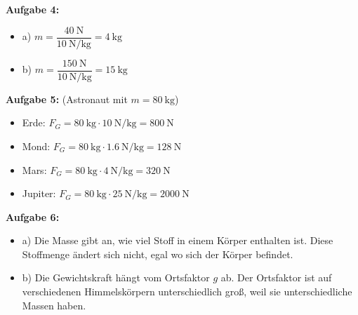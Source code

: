 \documentclass[a4paper,11pt]{article}
\begin{document}
\textbf{Aufgabe 4:}
\begin{itemize}[nosep]
    \item a) $m = \dfrac{\SI{40}{\newton}}{\SI{10}{\newton\per\kilogram}} = \SI{4}{\kilogram}$
    \item b) $m = \dfrac{\SI{150}{\newton}}{\SI{10}{\newton\per\kilogram}} = \SI{15}{\kilogram}$
\end{itemize}

\vspace{3mm}

\textbf{Aufgabe 5:} (Astronaut mit $m = \SI{80}{\kilogram}$)
\begin{itemize}[nosep]
    \item Erde: $F_G = \SI{80}{\kilogram} \cdot \SI{10}{\newton\per\kilogram} = \SI{800}{\newton}$
    \item Mond: $F_G = \SI{80}{\kilogram} \cdot \SI{1,6}{\newton\per\kilogram} = \SI{128}{\newton}$
    \item Mars: $F_G = \SI{80}{\kilogram} \cdot \SI{4}{\newton\per\kilogram} = \SI{320}{\newton}$
    \item Jupiter: $F_G = \SI{80}{\kilogram} \cdot \SI{25}{\newton\per\kilogram} = \SI{2000}{\newton}$
\end{itemize}

\vspace{3mm}

\textbf{Aufgabe 6:}
\begin{itemize}[nosep]
    \item a) Die Masse gibt an, wie viel Stoff in einem Körper enthalten ist. Diese Stoffmenge ändert sich nicht, egal wo sich der Körper befindet.
    \item b) Die Gewichtskraft hängt vom Ortsfaktor $g$ ab. Der Ortsfaktor ist auf verschiedenen Himmelskörpern unterschiedlich groß, weil sie unterschiedliche Massen haben.
\end{itemize}
\end{document}
